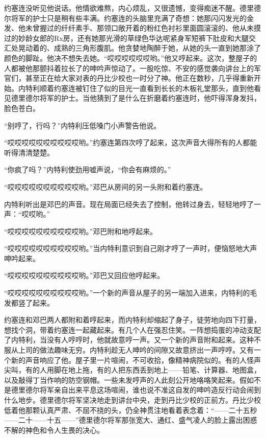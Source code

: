     约塞连没听见他说话。他情欲难熬，内心烦乱，又很遗憾，变得痴迷不醒。德里德尔将军的护士只是稍有些丰满。约塞连的头脑里充满了奇想：她那闪闪发光的金发、他未曾握过的纤纤素手、那领口敞开着的粉红色衬衫里面圆滚滚的、他从未摸过的妙龄女郎的Rx房，还有她那光滑的草绿色华达呢紧身军短裤下肚皮和大腿交汇处晃动着的、成熟的三角形腹肌。他贪婪地陶醉于她，从她的头一直到她那涂了颜色的脚趾。他决不想失去她。“哎哎哎哎哎哎哟。”他又哼起来。这次，整屋子的人都被他那颤抖着拉长了的呻吟声惊动了。一股吃惊、不安的感觉袭向讲台上的军官们，甚至正在给大家对表的丹比少校也一时分了神。他正在数秒，几乎得重新开始。内特利顺着约塞连被钉住了似的目光一直看到长长的木板礼堂那头，直到他看见德里德尔将军的护士。当他猜到了是什么在折磨着约塞连时，他吓得浑身发抖，脸色苍白。

    “别哼了，行吗？”内特利压低嗓门小声警告他说。

    “哎哎哎哎哎哎哎哎哎哎哟。”约塞连第四次哼了起来，这次声音大得所有的人都能听得清清楚楚。

    “你疯了吗？”内特利使劲用嘘声说，“你会有麻烦的。”

    “哎哎哎哎哎哎哎哎哎哎哟。”邓巴从房间的另一头附和着约塞连。

    内特利听出是邓巴的声音。现在局面已经失去了控制，他转过身去，轻轻地哼了一声：“哎哎哟。”

    “哎哎哎哎哎哎哎哎哎哎哟。”邓巴附和地哼起来。

    “哎哎哎哎哎哎哎哎哎哎哟。”当内特利意识到自己刚才哼了一声时，便恼怒地大声呻吟起来。

    “哎哎哎哎哎哎哎哎哎哎哟。”邓巴又回应他哼起来。

    “哎哎哎哎哎哎哎哎哎哎哟。”一个新的声音从屋子的另一端加入进来，内特利的毛发都竖了起来。

    约塞连和邓巴两人都附和着哼起来，而内特利却缩起了身子，徒劳地向四下打量，想找个洞，带着约塞连一起藏起来。有几个人在强忍住笑。一阵想捣蛋的冲动支配了内特利，当没有人哼哼时，他就故意哼一声。又一个新的声音附和起来。这种不服从上司的做法趣味无穷。内特利趁无人呻吟的间隙又故意挤出一声哼哼。又有一个新的声音响应了他。屋子里一片喧闹，不可收拾，像精神病院似的。有的人怪声尖叫，有的人用脚在地上拖，有的人把东西丢到地上——铅笔、计算器、地图盒，以及敲得丁当作响的防空钢帽。一些未发哼声的人此刻公开地咯咯笑起来。假如不是德里德尔将军亲自出来平息这场喧闹，谁也说不准这自发的呻吟造反行动会闹到什么地步。德里德尔将军坚决地走到讲台中央，走到丹比少校的正前方。丹比少校低着他那颗认真严肃、不屈不挠的头，仍全神贯注地看着表念着：“——二十五秒——二十——十五——”德里德尔将军那张宽大、通红、盛气凌人的脸上露出困惑不解的神色和令人生畏的决心。

